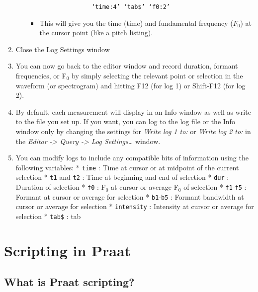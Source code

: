 \begin{enumerate}
\begin{itemize}
    \begin{verbatim}
                  ‘time:4’ ‘tab$’ ‘f0:2’
              \end{verbatim}

    \begin{itemize}
    \tightlist
    \item
      This will give you the time (time) and fundamental frequency
      (\(F_0\)) at the cursor point (like a pitch listing).
    \end{itemize}
  \end{itemize}
\item
  Close the Log Settings window
\item
  You can now go back to the editor window and record duration, formant
  frequencies, or F$_{0}$ by simply selecting the relevant point or selection
  in the waveform (or spectrogram) and hitting F12 (for log 1) or
  Shift-F12 (for log 2).
\item
  By default, each measurement will display in an Info window as well as
  write to the file you set up. If you want, you can log to the log file
  or the Info window only by changing the settings for \emph{Write log 1
  to:} or \emph{Write log 2 to:} in the \emph{Editor -\textgreater{}
  Query -\textgreater{} Log Settings\ldots{}} window.
\item
  You can modify logs to include any compatible bits of information
  using the following variables: * \texttt{time} : Time at cursor or at
  midpoint of the current selection * \texttt{t1} and \texttt{t2} : Time
  at beginning and end of selection * \texttt{dur} : Duration of
  selection * \texttt{f0} : F$_{0}$ at cursor or average F$_{0}$ of selection *
  \texttt{f1}-\texttt{f5} : Formant at cursor or average for selection *
  \texttt{b1}-\texttt{b5} : Formant bandwidth at cursor or average for
  selection * \texttt{intensity} : Intensity at cursor or average for
  selection * \texttt{tab\$} : tab
\end{enumerate}

\hypertarget{scripting-in-praat}{%
\section{Scripting in Praat}\label{scripting-in-praat}}

\label{sec:scripting}

\hypertarget{what-is-praat-scripting}{%
\subsection{What is Praat scripting?}\label{what-is-praat-scripting}}


